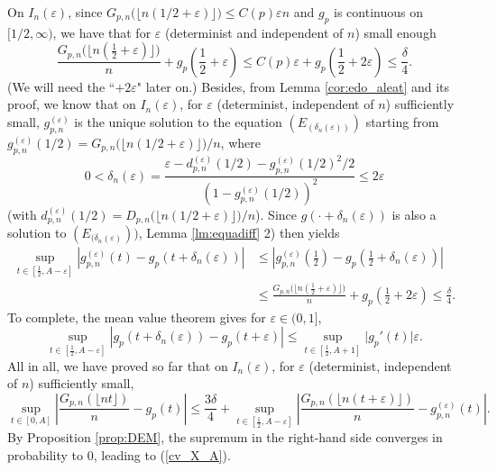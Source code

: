 \documentclass[a4, 11pt]{article}
\numberwithin{equation}{section}
\theoremstyle{plain}
\theoremstyle{definition}
\theoremstyle{remark}
\begin{document}
On $I_n(\varepsilon)$, since $G_{p,n}\big(\big\lfloor n(1/2+\varepsilon)\big\rfloor\big) \leq C(p)\varepsilon n$ and $g_p$ is continuous on $[1/2,\infty)$, we have that for $\varepsilon$ (determinist and independent of $n$) small enough
$$
 \frac{G_{p,n}\big(\big\lfloor n(\frac{1}{2}+\varepsilon)\big\rfloor\big)}{n} +g_p\left(\frac{1}{2}+\varepsilon\right) \leq C(p)\varepsilon+g_p\left(\frac{1}{2}+2\varepsilon\right) \leq \frac{\delta}{4}.
$$
(We will need the ``$+2\varepsilon$" later on.) Besides, from Lemma  \ref{cor:edo_aleat} and its proof, we know that on $I_n(\varepsilon)$, for $\varepsilon$ (determinist, independent of $n$) sufficiently small, $g_{p,n}^{(\varepsilon)}$ is the unique solution to the equation $(E_{(\delta_n(\varepsilon))})$ starting from $g_{p,n}^{(\varepsilon)}(1/2)= G_{p,n}\big(\lfloor n(1/2+\varepsilon)\rfloor\big)/n$, where 
$$0<\delta_n(\varepsilon)=\frac{\varepsilon-d_{p,n}^{(\varepsilon)}(1/2)-g_{p,n}^{(\varepsilon)}(1/2)^2/2}{(1-g_{p,n}^{(\varepsilon)}(1/2))^2} \leq 2 \varepsilon$$
(with $d_{p,n}^{(\varepsilon)}(1/2)=D_{p,n}\big(\big\lfloor n(1/2+\varepsilon)\big\rfloor\big)/n$). Since $g(\cdot+\delta_n(\varepsilon))$ is also a solution to $(E_{(\delta_n(\varepsilon)}))$, Lemma \ref{lm:equadiff} 2) then yields
\begin{align*}
	\sup_{t\in \left[\frac{1}{2},A-\varepsilon\right]} \left \vert g_{p,n}^{(\varepsilon)}\left(t\right)- g_p\left(t+\delta_n(\varepsilon)\right)\right\vert&\leq \left\vert g_{p,n}^{(\varepsilon)}\left(\frac{1}{2}\right)- g_p\left(\frac{1}{2}+\delta_n(\varepsilon)\right)\right\vert \\
	 &\leq  \frac{G_{p,n}\big(\big\lfloor n(\frac{1}{2}+\varepsilon)\big\rfloor\big)}{n}+g_p\left(\frac{1}{2}+2 \varepsilon \right) \leq  \frac{\delta}{4}.
\end{align*}
To complete, the mean value theorem gives for $\varepsilon  \in (0, 1]$,
$$\sup_{t\in \left[\frac{1}{2},A-\varepsilon\right]}\left\vert g_p\left(t+\delta_n(\varepsilon)\right) -g_p\left(t+\varepsilon\right)\right\vert\leq \sup_{t\in \left[\frac{1}{2},A+1\right]}\lvert g_p'(t)\rvert  \varepsilon.$$
All in all, we have proved so far that on $I_n(\varepsilon)$, for $\varepsilon$ (determinist, independent of $n$) sufficiently small,
$$
\sup_{t \in [0,A]}\left \vert \frac{G_{p,n}\left(\lfloor nt\rfloor\right)}{n} -g_p(t) \right\vert \leq \frac{3 \delta}{4} + \sup_{t \in \left[\frac{1}{2},A-\varepsilon\right]}\left \vert \frac{G_{p,n}\left(\lfloor n(t+\varepsilon)\rfloor\right)}{n} -g^{(\varepsilon)}_{p,n}(t) \right\vert.
$$
By Proposition \ref{prop:DEM}, the supremum in the right-hand side converges in probability to 0, leading to (\ref{cv_X_A}).
\end{document}
